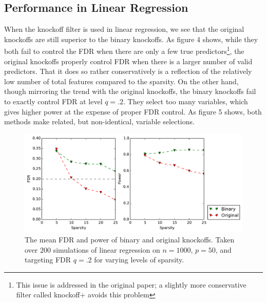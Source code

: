 \documentclass[11pt]{article}
\theoremstyle{definition}
\begin{document}
\subsection{Performance in Linear Regression} 
    \FloatBarrier
    When the knockoff filter is used in linear regression, we see that the original knockoffs are still superior to the binary knockoffs. As figure 4 shows, while they both fail to control the FDR when there are only a few true predictors\footnote{This issue is addressed in the original paper; a slightly more conservative filter called knockoff+ avoids this problem}, the original knockoffs properly control FDR when there is a larger number of valid predictors. That it does so rather conservatively is a reflection of the relatively low number of total features compared to the sparsity. On the other hand, though mirroring the trend with the original knockoffs, the binary knockoffs fail to exactly control FDR at level $q=.2$. They select too many variables, which gives higher power at the expense of proper FDR control. As figure 5 shows, both methods make related, but non-identical, variable selections. \par
    
    \begin{figure}[h]
        \begin{center}
        \includegraphics[width=14cm]{images/lasso_FDR_power_50}
    \end{center}
    \caption{\linespread{1}\selectfont{}The mean FDR and power of binary and original knockoffs. Taken over $200$ simulations of linear regression on $n=1000$, $p=50$, and targeting FDR $q=.2$ for varying levels of sparsity.}  
    \end{figure}
\end{document}

